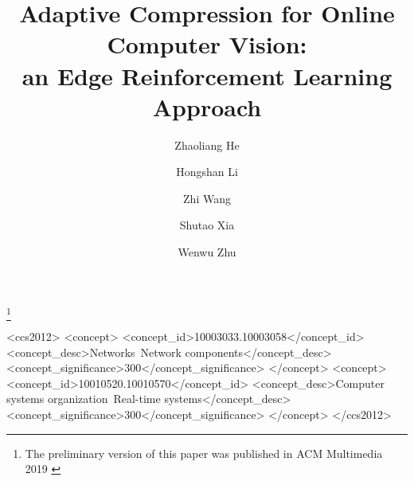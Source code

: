 \documentclass[acmsmall]{acmart}
\begin{document}
\title{Adaptive Compression for Online Computer Vision:\\an Edge Reinforcement Learning Approach}

\author{Zhaoliang He}

\author{Hongshan Li}

\author{Zhi Wang}

\author{Shutao Xia}

\author{Wenwu Zhu}

\thanks{The preliminary version of this paper was published in ACM Multimedia 2019 \cite{2019adacompress}}

\renewcommand{\shortauthors}{Zhaoliang He and Hongshan Li, et al.}



\begin{CCSXML}
	<ccs2012>
	<concept>
	<concept_id>10003033.10003058</concept_id>
	<concept_desc>Networks~Network components</concept_desc>
	<concept_significance>300</concept_significance>
	</concept>
	<concept>
	<concept_id>10010520.10010570</concept_id>
	<concept_desc>Computer systems organization~Real-time systems</concept_desc>
	<concept_significance>300</concept_significance>
	</concept>
	</ccs2012>
\end{CCSXML}
\end{document}
